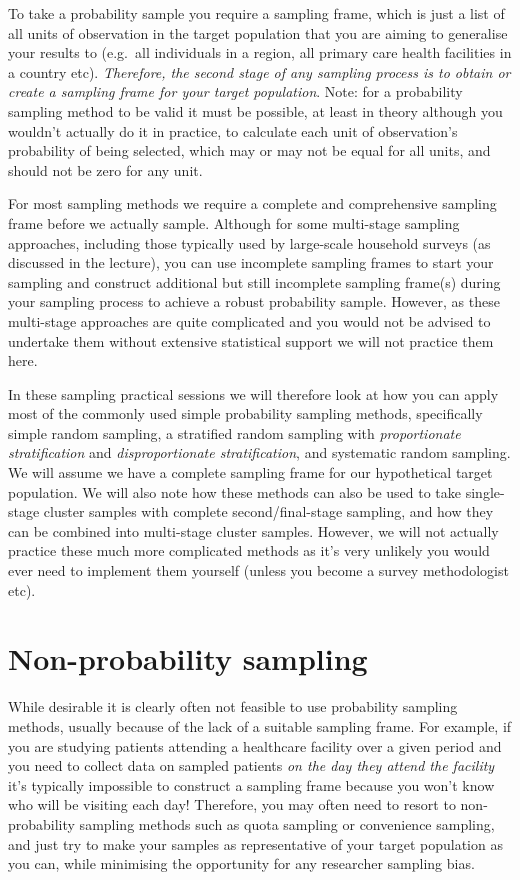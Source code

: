 \documentclass[
]{book}
\begin{document}
To take a probability sample you require a sampling frame, which is just a list of all units of observation in the target population that you are aiming to generalise your results to (e.g.~all individuals in a region, all primary care health facilities in a country etc). \emph{Therefore, the second stage of any sampling process is to obtain or create a sampling frame for your target population}. Note: for a probability sampling method to be valid it must be possible, at least in theory although you wouldn't actually do it in practice, to calculate each unit of observation's probability of being selected, which may or may not be equal for all units, and should not be zero for any unit.

For most sampling methods we require a complete and comprehensive sampling frame before we actually sample. Although for some multi-stage sampling approaches, including those typically used by large-scale household surveys (as discussed in the lecture), you can use incomplete sampling frames to start your sampling and construct additional but still incomplete sampling frame(s) during your sampling process to achieve a robust probability sample. However, as these multi-stage approaches are quite complicated and you would not be advised to undertake them without extensive statistical support we will not practice them here.

In these sampling practical sessions we will therefore look at how you can apply most of the commonly used simple probability sampling methods, specifically simple random sampling, a stratified random sampling with \emph{proportionate stratification} and \emph{disproportionate stratification}, and systematic random sampling. We will assume we have a complete sampling frame for our hypothetical target population. We will also note how these methods can also be used to take single-stage cluster samples with complete second/final-stage sampling, and how they can be combined into multi-stage cluster samples. However, we will not actually practice these much more complicated methods as it's very unlikely you would ever need to implement them yourself (unless you become a survey methodologist etc).

\hypertarget{non-probability-sampling}{%
\section{Non-probability sampling}\label{non-probability-sampling}}

While desirable it is clearly often not feasible to use probability sampling methods, usually because of the lack of a suitable sampling frame. For example, if you are studying patients attending a healthcare facility over a given period and you need to collect data on sampled patients \emph{on the day they attend the facility} it's typically impossible to construct a sampling frame because you won't know who will be visiting each day! Therefore, you may often need to resort to non-probability sampling methods such as quota sampling or convenience sampling, and just try to make your samples as representative of your target population as you can, while minimising the opportunity for any researcher sampling bias.
\end{document}
